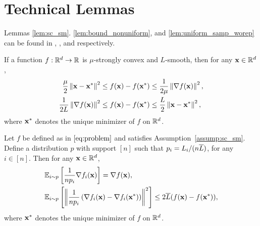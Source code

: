 \documentclass[10pt,twocolumn,journal]{IEEEtran}
\begin{document}
\section{Technical Lemmas}\label{app:tech_lemma}
Lemmas \ref{lem:sc_sm}. \ref{lem:bound_nonuniform}, and \ref{lem:uniform_samp_worep} can be found in \cite[Chapter~9]{Boyd_04}, \cite{Xiao_14}, and \cite{Nitanda_14} respectively.
\begin{lemma}\label{lem:sc_sm}  
    If a function $f:\mathbb{R}^d\to\mathbb{R}$ is $\mu$-strongly convex and $L$-smooth, then for any $\mathbf{x}\in\mathbb{R}^d$, 
\begin{align}
\frac{\mu}{2} \left\Vert\mathbf{x}-\mathbf{x}^*\right\Vert^2 &\le f(\mathbf{x}) - f(\mathbf{x}^*) \le \frac{1}{2\mu} \left\Vert\nabla f(\mathbf{x})\right\Vert^2,\label{eq:bound_sc}\\
\frac{1}{2L} \left\Vert\nabla f(\mathbf{x})\right\Vert^2  &\le f(\mathbf{x}) - f(\mathbf{x}^*) \le \frac{L}{2} \left\Vert\mathbf{x}-\mathbf{x}^*\right\Vert^2, \label{eq:bound_sm}
\end{align}
where $\mathbf{x}^*$ denotes the unique minimizer of $f$ on $\mathbb{R}^d$. 
\end{lemma}

\begin{lemma}\label{lem:bound_nonuniform}  
Let $f$ be defined as in $\eqref{eq:problem}$ and satisfies Assumption~\ref{assump:sc_sm}. Define a distribution $p$ with support $[n]$ such that $p_i=L_i/(n\overline{L})$, for any $i\in[n]$. Then for any $\mathbf{x}\in\mathbb{R}^d$, 
\begin{align}
&\mathbb{E}_{i\sim p}\left[\frac{1}{np_{i}}\nabla f_{i}(\mathbf{x})\right] = \nabla f(\mathbf{x}),\label{eq:expectation_nonuni}\\
&\mathbb{E}_{i\sim p}\left[\left\Vert\frac{1}{np_{i}}\left(\nabla f_{i}(\mathbf{x})-\nabla f_{i}(\mathbf{x}^*)\right)\right\Vert^2\right]\le 2\overline{L}(f(\mathbf{x})-f(\mathbf{x}^*)), \label{eq:bound_norm_nonuni}
\end{align} 
where $\mathbf{x}^*$ denotes the unique minimizer of $f$ on $\mathbb{R}^d$. 
\end{lemma}
\end{document}
